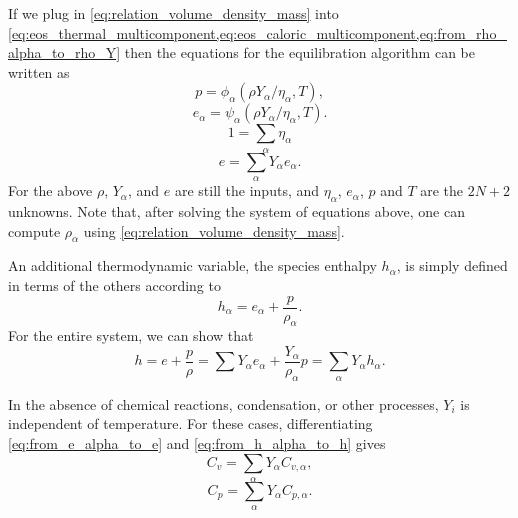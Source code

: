 \documentclass[oneside,a4paper,11pt]{report}
\begin{document}
If we plug in \cref{eq:relation_volume_density_mass} into \cref{eq:eos_thermal_multicomponent,eq:eos_caloric_multicomponent,eq:from_rho_alpha_to_rho_Y} then the equations for the equilibration algorithm can be written as 
\begin{equation}
    p = \phi_\alpha (\rho Y_\alpha / \eta_\alpha, T),
\end{equation}
\begin{equation}
    e_\alpha = \psi_\alpha (\rho Y_\alpha / \eta_\alpha, T).
\end{equation}
\begin{equation}
    1 = \sum_\alpha \eta_\alpha
\end{equation}
\begin{equation}
    e = \sum_\alpha Y_\alpha e_\alpha.
\end{equation}
For the above $\rho$, $Y_\alpha$, and $e$ are still the inputs, and $\eta_\alpha$, $e_\alpha$, $p$ and $T$ are the $2N+2$ unknowns. Note that, after solving the system of equations above, one can compute $\rho_\alpha$ using \cref{eq:relation_volume_density_mass}.

An additional thermodynamic variable, the species enthalpy $h_\alpha$, is simply defined in terms of the others according to 
\begin{equation}
\label{eq:species_enthalpy}
    h_\alpha = e_\alpha + \frac{p}{\rho_\alpha}.
\end{equation}
For the entire system, we can show that
\begin{equation}
\label{eq:from_h_alpha_to_h}
     h = e + \frac{p}{\rho} = \sum Y_\alpha e_\alpha + \frac{Y_\alpha}{\rho_\alpha} p = \sum_\alpha Y_\alpha h_\alpha.
\end{equation}

In the absence of chemical reactions, condensation, or other processes, $Y_i$ is independent of temperature. For these cases, differentiating \cref{eq:from_e_alpha_to_e} and \cref{eq:from_h_alpha_to_h} gives
\begin{equation}
    C_v = \sum_\alpha Y_\alpha C_{v,\alpha},
\end{equation}
\begin{equation}
    C_p = \sum_\alpha Y_\alpha C_{p,\alpha}.
\end{equation}
\end{document}
